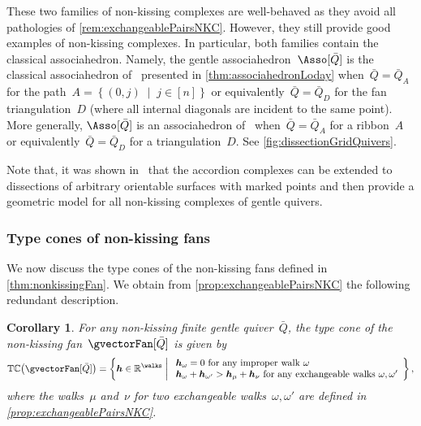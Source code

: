 \documentclass{amsart}
\newtheorem{corollary}[theorem]{Corollary}
\theoremstyle{definition}
\newcommand{\R}{\mathbb{R}} %
\renewcommand{\b}[1]{{\boldsymbol{#1}}} %
\newcommand{\set}[2]{\left\{ #1 \;\middle|\; #2 \right\}} %
\newcommand{\typeCone}{\mathbb{TC}} %
\newcommand{\quiver}{\bar Q} %
\begin{document}
These two families of non-kissing complexes are well-behaved as they avoid all pathologies of \cref{rem:exchangeablePairsNKC}.
However, they still provide good examples of non-kissing complexes.
In particular, both families contain the classical associahedron.
Namely, the gentle associahedron~$\Asso[\quiver]$ is the classical associahedron of~\cite{ShniderSternberg, Loday} presented in \cref{thm:associahedronLoday} when~${\quiver = \quiver_A}$ for the path~${A = \set{(0,j)}{j \in [n]}}$ or equivalently~$\quiver = \quiver_D$ for the fan triangulation~$D$ (where all internal diagonals are incident to the same point).
More generally, $\Asso[\quiver]$ is an associahedron of~\cite{HohlwegLange} when~$\quiver = \quiver_A$ for a ribbon~$A$ or equivalently~$\quiver = \quiver_D$ for a triangulation~$D$.
See \cref{fig:dissectionGridQuivers}.

Note that, it was shown in~\cite{PaluPilaudPlamondon-surfaces} that the accordion complexes can be extended to dissections of arbitrary orientable surfaces with marked points and then provide a geometric model for all non-kissing complexes of gentle quivers.


\subsubsection{Type cones of non-kissing fans}

We now discuss the type cones of the non-kissing fans defined in \cref{thm:nonkissingFan}. We obtain from \cref{prop:exchangeablePairsNKC} the following redundant description.

\begin{corollary}
For any non-kissing finite gentle quiver~$\quiver$, the type cone of the non-kissing fan~$\gvectorFan[\quiver]$ is given by
\[
\typeCone \big( \gvectorFan[\quiver] \big) = \set{\b{h} \in \R^{\walks}}{\begin{array}{l} \b{h}_\omega = 0 \text{ for any improper walk } \omega \\ \b{h}_\omega + \b{h}_{\omega'} > \b{h}_\mu + \b{h}_\nu \text{ for any exchangeable walks } \omega, \omega' \end{array}},
\]
where the walks~$\mu$ and~$\nu$ for two exchangeable walks~$\omega, \omega'$ are defined in \cref{prop:exchangeablePairsNKC}.
\end{corollary}

\pagebreak
\end{document}
